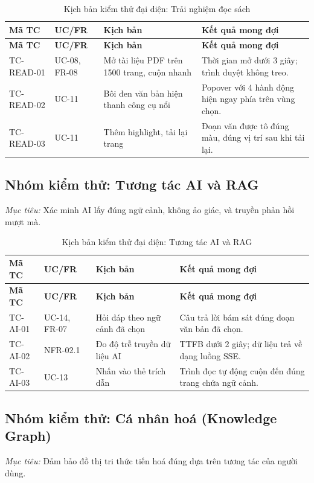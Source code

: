 \begin{longtable}{|C{0.15\textwidth}|C{0.15\textwidth}|L{0.27\textwidth}|L{0.31\textwidth}|}
\caption{Kịch bản kiểm thử đại diện: Trải nghiệm đọc sách}\\
\hline
\textbf{Mã TC} & \textbf{UC/FR} & \textbf{Kịch bản} & \textbf{Kết quả mong đợi} \\\hline
\endfirsthead
\hline
\textbf{Mã TC} & \textbf{UC/FR} & \textbf{Kịch bản} & \textbf{Kết quả mong đợi} \\\hline
\endhead
\mbox{TC-READ-01} & UC-08, FR-08 & Mở tài liệu PDF trên 1500 trang, cuộn nhanh & Thời gian mở dưới 3 giây; trình duyệt không treo. \\\hline
\mbox{TC-READ-02} & UC-11 & Bôi đen văn bản hiện thanh công cụ nổi & Popover với 4 hành động hiện ngay phía trên vùng chọn. \\\hline
\mbox{TC-READ-03} & UC-11 & Thêm highlight, tải lại trang & Đoạn văn được tô đúng màu, đúng vị trí sau khi tải lại. \\\hline
\end{longtable}

\subsection{Nhóm kiểm thử: Tương tác AI và RAG}
\textit{Mục tiêu:} Xác minh AI lấy đúng ngữ cảnh, không ảo giác, và truyền phản hồi mượt mà.

\begin{longtable}{|C{0.15\textwidth}|C{0.15\textwidth}|L{0.27\textwidth}|L{0.31\textwidth}|}
\caption{Kịch bản kiểm thử đại diện: Tương tác AI và RAG}\\
\hline
\textbf{Mã TC} & \textbf{UC/FR} & \textbf{Kịch bản} & \textbf{Kết quả mong đợi} \\\hline
\endfirsthead
\hline
\textbf{Mã TC} & \textbf{UC/FR} & \textbf{Kịch bản} & \textbf{Kết quả mong đợi} \\\hline
\endhead
\mbox{TC-AI-01} & UC-14, FR-07 & Hỏi đáp theo ngữ cảnh đã chọn & Câu trả lời bám sát đúng đoạn văn bản đã chọn. \\\hline
\mbox{TC-AI-02} & NFR-02.1 & Đo độ trễ truyền dữ liệu AI & TTFB dưới 2 giây; dữ liệu trả về dạng luồng SSE. \\\hline
\mbox{TC-AI-03} & UC-13 & Nhấn vào thẻ trích dẫn & Trình đọc tự động cuộn đến đúng trang chứa ngữ cảnh. \\\hline
\end{longtable}

\subsection{Nhóm kiểm thử: Cá nhân hoá (Knowledge Graph)}
\textit{Mục tiêu:} Đảm bảo đồ thị tri thức tiến hoá đúng dựa trên tương tác của người dùng.

